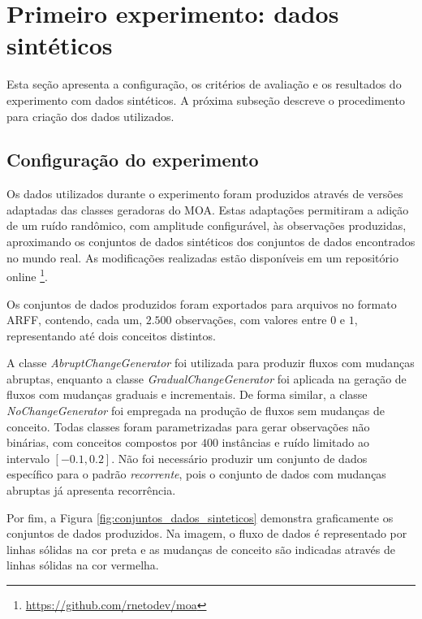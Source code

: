 \documentclass[msc, classic, a4paper]{ufbathesis}
\begin{document}
\section{Primeiro experimento: dados sintéticos}

Esta seção apresenta a configuração, os critérios de avaliação e os resultados do experimento com dados sintéticos.
A próxima subseção descreve o procedimento para criação dos dados utilizados.

\subsection{Configuração do experimento}
\label{sec:configuracao_experimento_sintetico}

Os dados utilizados durante o experimento foram produzidos através de versões adaptadas das classes geradoras do MOA.
Estas adaptações permitiram a adição de um ruído randômico, com amplitude configurável, às observações produzidas, aproximando os conjuntos de dados sintéticos dos conjuntos de dados encontrados no mundo real. As modificações realizadas estão disponíveis em um repositório online \footnote{\url{https://github.com/rnetodev/moa}}.

Os conjuntos de dados produzidos foram exportados para arquivos no formato ARFF, contendo, cada um, $2.500$ observações, com valores entre $0$ e $1$, representando até dois conceitos distintos. 

A classe \textit{AbruptChangeGenerator} foi utilizada para produzir fluxos com mudanças abruptas, enquanto a classe \textit{GradualChangeGenerator} foi aplicada na geração de fluxos com mudanças graduais e incrementais. De forma similar, a classe \textit{NoChangeGenerator} foi empregada na produção de fluxos sem mudanças de conceito.
Todas classes foram parametrizadas para gerar observações não binárias, com conceitos compostos por $400$ instâncias e 
ruído limitado ao intervalo $[-0.1, 0.2]$.
Não foi necessário produzir um conjunto de dados específico para o padrão \textit{recorrente}, pois o conjunto de dados com mudanças abruptas já apresenta recorrência.

Por fim, a Figura \ref{fig:conjuntos_dados_sinteticos} demonstra graficamente os conjuntos de dados produzidos.
Na imagem, o fluxo de dados é representado por linhas sólidas na cor preta e as mudanças de conceito são indicadas através de linhas sólidas na cor vermelha.
\end{document}

